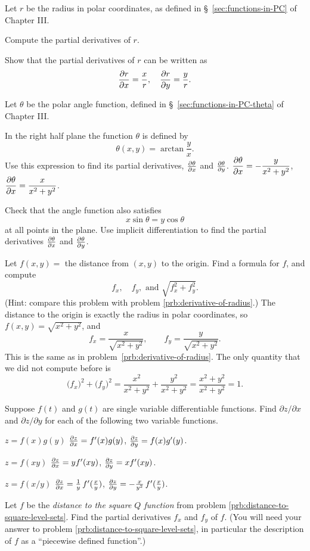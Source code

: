 \begin{multicols}{2}
\problem \label{prb:derivative-of-radius}%
Let $r$ be the radius in polar coordinates, as defined in
\S~\ref{sec:functions-in-PC} of Chapter III.

\subprob Compute the partial derivatives of $r$.

\subprob Show that the partial derivatives of $r$ can be written as
\[
\frac{\partial r}{\partial x} = \frac xr, \quad
\frac{\partial r}{\partial y} = \frac yr.
\]

\problem \label{prb:derivative-of-theta}%
Let $\theta$ be the polar angle function, defined in
\S~\ref{sec:functions-in-PC-theta} of Chapter III.

\subprob In the right half plane the function $\theta$ is defined by
\[
\theta(x,y) = \arctan\frac{y} {x}.
\]
Use this expression to find its partial derivatives, $\frac{\partial \theta}{\partial x}$ and $\frac{\partial \theta}{\partial y}$.
\answer
$\displaystyle\frac{\partial \theta}{\partial x} = -\frac{y} {x^2+y^2}$, $\displaystyle\frac{\partial \theta}{\partial x} = \frac{x} {x^2+y^2}$.
\endanswer

\subprob {\tiny\textdbend} Check that the angle function also satisfies
\[
x\sin\theta = y\cos \theta
\]
at all points in the plane.  Use implicit differentiation to find the partial
derivatives $\frac{\partial \theta}{\partial x}$ and $\frac{\partial \theta}{\partial y}$.


\problem Let $f(x, y) = $ the distance from $(x,y)$ to the origin. 
Find a formula for $f$, and compute
\[
f_x, \quad f_y, \text{ and } \sqrt{f_x^2 +f_y^2}.
\]
(Hint: compare this problem with problem \ref{prb:derivative-of-radius}.)
\answer
The distance to the origin is exactly the radius in polar coordinates, so
$f(x, y) = \sqrt{x^2+y^2}$, and
\[
f_x = \frac{x} {\sqrt{x^2+y^2}},\qquad
f_y = \frac{y} {\sqrt{x^2+y^2}}.
\]
This is the same as in problem~\ref{prb:derivative-of-radius}.  The only
quantity that we did not compute before is
\[
\bigl(f_x\bigr)^2 + \bigl(f_y\bigr)^2 = \frac{x^2} {x^2+y^2} + \frac{y^2}
{x^2+y^2} = \frac{x^2+y^2} {x^2+y^2} = 1.
\]
\endanswer

\problem Suppose $f(t)$ and $g(t)$ are single variable differentiable 
functions.  Find $\partial z/\partial x$ and
$\partial z/\partial y$ for each of the following two variable functions.

\subprob  $z=f(x)g(y)$
\answer
$\frac{\partial z}{\partial x} = f'(x)g(y)$, 
$\frac{\partial z}{\partial y} = f(x)g'(y)$.
\endanswer

\subprob  $z=f(xy)$
\answer
$\frac{\partial z}{\partial x} = yf'(xy)$, 
$\frac{\partial z}{\partial y} = xf'(xy)$.
\endanswer

\subprob  $z=f(x/y)$
\answer
$\frac{\partial z}{\partial x} = \frac{1}{y}\, f'(\frac xy)$, 
$\frac{\partial z}{\partial y} = -\frac{x}{y^2} \, f'(\frac xy)$.
\endanswer

\problem
\label{prb:distance-to-square-partialderivs}
Let $f$ be the \emph{distance to the square $Q$ function} from
problem \ref{prb:distance-to-square-level-sets}.  Find the partial
derivatives $f_x$ and $f_y$ of $f$.  (You will need your answer to
problem \ref{prb:distance-to-square-level-sets}, in particular the
description of $f$ as a ``piecewise defined function''.)


\end{multicols}

